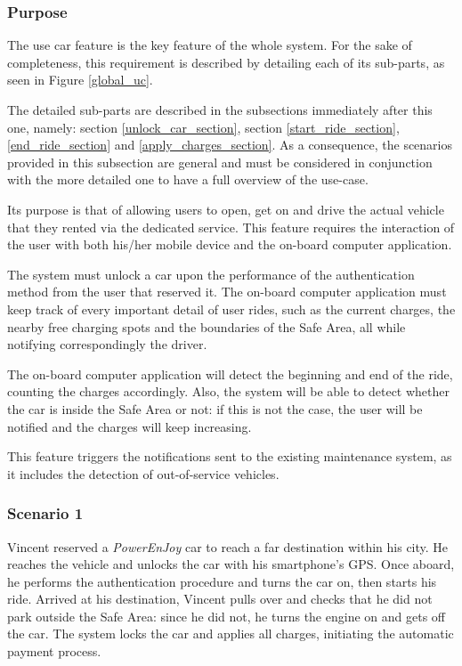 \subsubsection{Purpose}
The use car feature is the key feature of the whole system. For the sake of completeness, this requirement is described by detailing each of its sub-parts, as seen in Figure \ref{global_uc}.

The detailed sub-parts are described in the subsections immediately after this one, namely: section \ref{unlock_car_section}, section \ref{start_ride_section}, \ref{end_ride_section} and \ref{apply_charges_section}. As a consequence, the scenarios provided in this subsection are general and must be considered in conjunction with the more detailed one to have a full overview of the use-case.

Its purpose is that of allowing users to open, get on and drive the actual vehicle that they rented via the dedicated service. This feature requires the interaction of the user with both his/her mobile device and the on-board computer application.

The system must unlock a car upon the performance of the authentication method from the user that reserved it. The on-board computer application must keep track of every important detail of user rides, such as the current charges, the nearby free charging spots and the boundaries of the Safe Area, all while notifying correspondingly the driver.

The on-board computer application will detect the beginning and end of the ride, counting the charges accordingly. Also, the system will be able to detect whether the car is inside the Safe Area or not: if this is not the case, the user will be notified and the charges will keep increasing.

This feature triggers the notifications sent to the existing maintenance system, as it includes the detection of out-of-service vehicles.

\subsubsection{Scenario 1}
Vincent reserved a \emph{PowerEnJoy} car to reach a far destination within his city. He reaches the vehicle and unlocks the car with his smartphone's GPS. Once aboard, he performs the authentication procedure and turns the car on, then starts his ride. Arrived at his destination, Vincent pulls over and checks that he did not park outside the Safe Area: since he did not, he turns the engine on and gets off the car. The system locks the car and applies all charges, initiating the automatic payment process.

